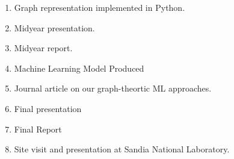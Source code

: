 \begin{enumerate}
\item Graph representation implemented in Python. 
\item Midyear presentation.
\item Midyear report. 
\item Machine Learning Model Produced
\item Journal article on our graph-theortic ML approaches.
\item Final presentation
\item Final Report
\item Site visit and presentation at Sandia National Laboratory.  

\end{enumerate}

